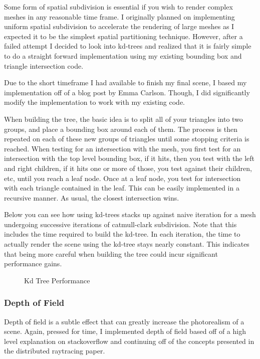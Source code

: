 \documentclass[12pt]{article}
\begin{document}
Some form of spatial subdivision is essential if you wish to render complex meshes in any reasonable time frame. I originally planned on implementing uniform spatial subdivision to accelerate the rendering of large meshes as I expected it to be the simplest spatial partitioning technique. However, after a failed attempt I decided to look into kd-trees and realized that it is fairly simple to do a straight forward implementation using my existing bounding box and triangle intersection code.

Due to the short timeframe I had available to finish my final scene, I based my implementation off of a blog post by Emma Carlson\cite{kd}. Though, I did significantly modify the implementation to work with my existing code.

When building the tree, the basic idea is to split all of your triangles into two groups, and place a bounding box around each of them. The process is then repeated on each of these new groups of triangles until some stopping criteria is reached. When testing for an intersection with the mesh, you first test for an intersection with the top level bounding box, if it hits, then you test with the left and right children, if it hits one or more of those, you test against their children, etc, until you reach a leaf node. Once at a leaf node, you test for intersection with each triangle contained in the leaf. This can be easily implemented in a recursive manner. As usual, the closest intersection wins.

Below you can see how using kd-trees stacks up against naive iteration for a mesh undergoing successive iterations of catmull-clark subdivision. Note that this includes the time required to build the kd-tree. In each iteration, the time to actually render the scene using the kd-tree stays nearly constant. This indicates that being more careful when building the tree could incur significant performance gains.

\begin{figure}[h]
\centering
{}
\caption{Kd Tree Performance}
\label{Kd Tree}
\end{figure}

\subsubsection{Depth of Field}

Depth of field is a subtle effect that can greatly increase the photorealism of a scene. Again, pressed for time, I implemented depth of field based off of a high level explanation on stackoverflow\cite{dof} and continuing off of the concepts presented in the distributed raytracing paper\cite{distributed}.
\end{document}
